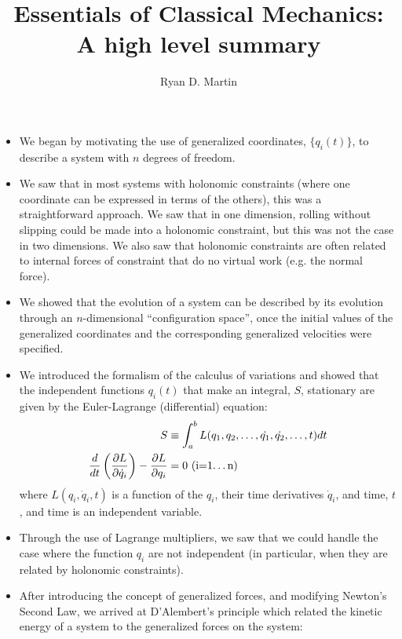 \documentclass[10pt]{report}
\begin{document}
\title{Essentials of Classical Mechanics: A high level summary}
\author{Ryan D. Martin}
\maketitle

\begin{itemize}

\item We began by motivating the use of generalized coordinates, $\{q_i(t)\}$, to describe a system with $n$ degrees of freedom.
\item We saw that in most systems with holonomic constraints (where one coordinate can be expressed in terms of the others), this was a straightforward approach. We saw that in one dimension, rolling without slipping could be made into a holonomic constraint, but this was not the case in two dimensions. We also saw that holonomic constraints are often related to internal forces of constraint that do no virtual work (e.g. the normal force).
\item We showed that the evolution of a system can be described by its evolution through an $n$-dimensional ``configuration space'', once the initial values of the generalized coordinates and the corresponding generalized velocities were specified.
\item We introduced the formalism of the calculus of variations and showed that the independent functions $q_i(t)$ that make an integral, $S$, stationary are given by the Euler-Lagrange (differential) equation:
\begin{align*}
S&\equiv\int_a^b L(q_1,q_2,\dots,\dot{q_1}, \dot{q_2},\dots,t)dt\\
\frac{d}{dt}\left(\frac{\partial L}{\partial \dot{q}_i}\right)-\frac{\partial L}{\partial q_i}&=0 \text{              (i=1\dots n)}
\end{align*}
where $L(q_i,\dot q_i,t)$ is a function of the $q_i$, their time derivatives $\dot q_i$, and time, $t$, and time is an independent variable.
\item Through the use of Lagrange multipliers, we saw that we could handle the case where the function $q_i$ are not independent (in particular, when they are related by holonomic constraints).
\item After introducing the concept of generalized forces,  and modifying Newton's Second Law, we arrived at D'Alembert's principle which related the kinetic energy of a system to the generalized forces on the system:
\begin{align*}

\end{align*}
\end{itemize}
\end{document}
